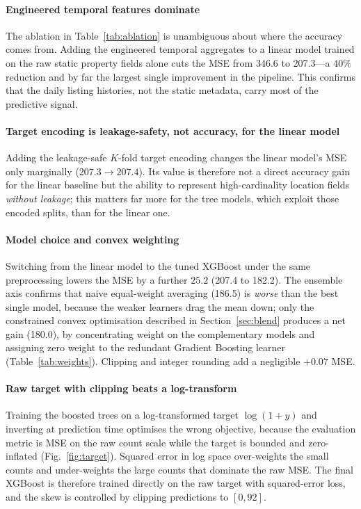 \documentclass[journal]{IEEEtran}
\begin{document}
\paragraph{Engineered temporal features dominate} The ablation in
Table~\ref{tab:ablation} is unambiguous about where the accuracy comes from.
Adding the engineered temporal aggregates to a linear model trained on the raw
static property fields alone cuts the MSE from 346.6 to 207.3---a $40\%$
reduction and by far the largest single improvement in the pipeline. This
confirms that the daily listing histories, not the static metadata, carry most of
the predictive signal.

\paragraph{Target encoding is leakage-safety, not accuracy, for the linear model}
Adding the leakage-safe $K$-fold target encoding changes the linear model's MSE
only marginally ($207.3\!\rightarrow\!207.4$). Its value is therefore not a direct
accuracy gain for the linear baseline but the ability to represent
high-cardinality location fields \emph{without leakage}; this matters far more
for the tree models, which exploit those encoded splits, than for the linear one.

\paragraph{Model choice and convex weighting} Switching from the linear model to
the tuned XGBoost under the same preprocessing lowers the MSE by a further $25.2$
(207.4 to 182.2). The ensemble axis confirms that naive equal-weight averaging
(186.5) is \emph{worse} than the best single model, because the weaker learners
drag the mean down; only the constrained convex optimisation described in
Section~\ref{sec:blend} produces a net gain (180.0), by
concentrating weight on the complementary models and assigning zero weight to the
redundant Gradient Boosting learner (Table~\ref{tab:weights}). Clipping and
integer rounding add a negligible $+0.07$ MSE.

\paragraph{Raw target with clipping beats a log-transform} Training the boosted
trees on a log-transformed target $\log(1+y)$ and inverting at prediction time
optimises the wrong objective, because the evaluation metric is MSE on the raw
count scale while the target is bounded and zero-inflated (Fig.~\ref{fig:target}).
Squared error in log space over-weights the small counts and under-weights the
large counts that dominate the raw MSE. The final XGBoost is therefore trained
directly on the raw target with squared-error loss, and the skew is controlled by
clipping predictions to $[0,92]$.
\end{document}
